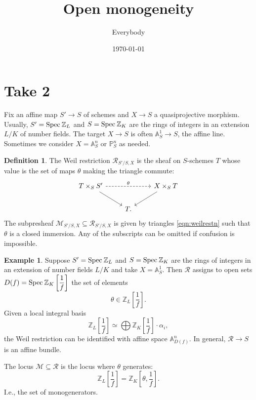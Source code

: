 \documentclass[11pt,reqno]{amsart}
\title{Open monogeneity}
\author{Everybody}
\date{\today}
\theoremstyle{definition}
\newtheorem{definition}[theorem]{Definition}
\newtheorem{example}[theorem]{Example}
\newcommand{\ZZ}{\mathbb{Z}}
\newcommand{\Aff}{{\mathbb{A}}}
\newcommand{\PP}{\mathbb{P}}
\newcommand{\Spec}{{\rm{Spec}\:}}
\newcommand{\WR}{\cal R}
\newcommand{\Gen}{\cal M}
\newcommand{\bra}[1]{\left[{#1}\right]}
\newcommand{\cal}[1]{\ensuremath{\mathcal{#1}}}
\begin{document}
	
\maketitle


\section{Take 2}

Fix an affine map $S' \to S$ of schemes and $X \to S$ a quasiprojective morphism. Usually, $S' = \Spec \ZZ_L$ and $S = \Spec \ZZ_K$ are the rings of integers in an extension $L/K$ of number fields. The target $X \to S$ is often $\Aff^1_S \to S$, the affine line. Sometimes we consider $X = \Aff^n_S$ or $\PP^n_S$ as needed. 


\begin{definition}
	The Weil restriction $\WR_{S'/S, X}$ is the sheaf on $S$-schemes $T$ whose value is the set of maps $\theta$ making the triangle commute:
	\begin{equation}\label{eqn:weilrestn}
		\begin{tikzcd}
			T \times_S S' \ar[rr, dashed, "\theta"] \ar[dr] 		&		&X \times_S T \ar[dl] 		\\
			&T.
		\end{tikzcd}
	\end{equation}
	The subpresheaf $\Gen_{S'/S, X} \subseteq \WR_{S'/S, X}$ is given by triangles \eqref{eqn:weilrestn} such that $\theta$ is a closed immersion. Any of the subscripts can be omitted if confusion is impossible. 
\end{definition}



\begin{example}
    Suppose $S' = \Spec \ZZ_L$ and $S = \Spec \ZZ_K$ are the rings of integers in an extension of number fields $L/K$ and take $X = \Aff^1_S$. Then $\WR$ assigns to open sets $D(f) = \Spec \ZZ_K \bra{\dfrac{1}{f}}$ the set of elements 
    \[
    \theta \in \ZZ_L\bra{\dfrac{1}{f}}.    
    \]
    Given a local integral basis 
    \[\ZZ_L\bra{\dfrac{1}{f}} \simeq \bigoplus \ZZ_K\bra{\dfrac{1}{f}} \cdot \alpha_i,\]
    the Weil restriction can be identified with affine space $\Aff^n_{D(f)}$. In general, $\WR \to S$ is an affine bundle. 

    The locus $\Gen \subseteq \WR$ is the locus where $\theta$ generates:
    \[\ZZ_L \bra{\dfrac{1}{f}} = \ZZ_K \bra{\theta, \dfrac{1}{f}}.\]
    I.e., the set of monogenerators. 
\end{example}
\end{document}
